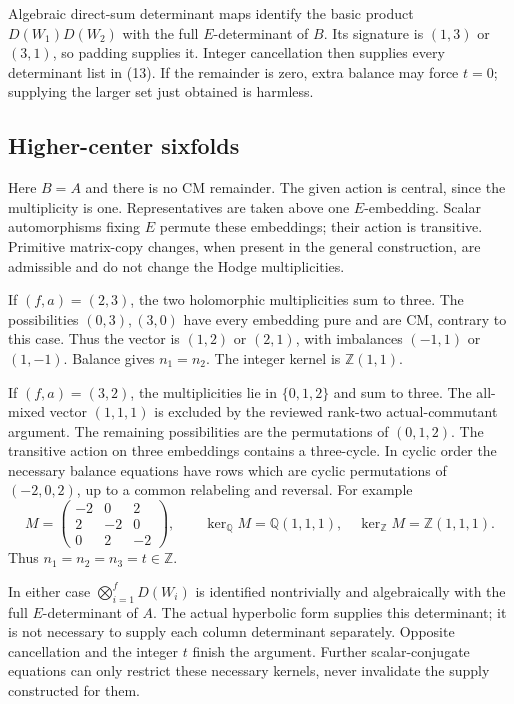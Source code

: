 \documentclass[11pt]{article}
\newcommand{\Q}{\mathbb Q}
\newcommand{\Z}{\mathbb Z}
\theoremstyle{remark}
\begin{document}
Algebraic direct-sum determinant maps identify the basic product
$D(W_1)D(W_2)$ with the full $E$-determinant of $B$.
Its signature is $(1,3)$ or $(3,1)$, so padding supplies it.
Integer cancellation then supplies every determinant list in (13).
If the remainder is zero, extra balance may force $t=0$; supplying
the larger set just obtained is harmless.

\subsection{Higher-center sixfolds}

Here $B=A$ and there is no CM remainder. The given action is central,
since the multiplicity is one. Representatives are taken above one
$E$-embedding. Scalar automorphisms fixing $E$ permute these embeddings;
their action is transitive. Primitive matrix-copy changes, when present
in the general construction, are admissible and do not change the
Hodge multiplicities.

If $(f,a)=(2,3)$, the two holomorphic multiplicities sum to three.
The possibilities $(0,3),(3,0)$ have every embedding pure and are
CM, contrary to this case. Thus the vector is $(1,2)$ or $(2,1)$,
with imbalances $(-1,1)$ or $(1,-1)$. Balance gives $n_1=n_2$.
The integer kernel is $\Z(1,1)$.

If $(f,a)=(3,2)$, the multiplicities lie in $\{0,1,2\}$ and sum
to three. The all-mixed vector $(1,1,1)$ is excluded by the reviewed
rank-two actual-commutant argument. The remaining possibilities are
the permutations of $(0,1,2)$. The transitive action on three
embeddings contains a three-cycle. In cyclic order the necessary
balance equations have rows which are cyclic permutations of
$(-2,0,2)$, up to a common relabeling and reversal. For example
\[
 M=\begin{pmatrix}-2&0&2\\2&-2&0\\0&2&-2\end{pmatrix},
       \qquad
 \ker_\Q M=\Q(1,1,1),\quad
 \ker_\Z M=\Z(1,1,1).
 \tag{15}\label{eq:cyclic}
\]
Thus $n_1=n_2=n_3=t\in\Z$.

In either case $\bigotimes_{i=1}^fD(W_i)$ is identified nontrivially
and algebraically with the full $E$-determinant of $A$.
The actual hyperbolic form supplies this determinant; it is not
necessary to supply each column determinant separately.
Opposite cancellation and the integer $t$ finish the argument.
Further scalar-conjugate equations can only restrict these necessary
kernels, never invalidate the supply constructed for them.
\end{document}
